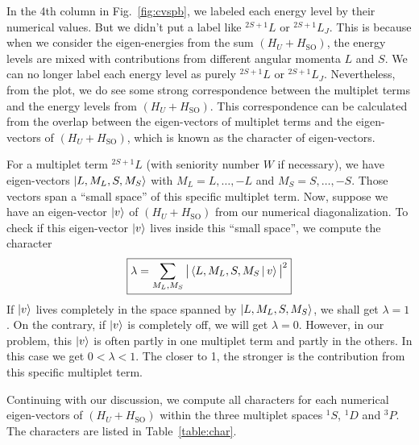 In the 4th column in Fig.~\ref{fig:cvspb}, we labeled each energy level by their numerical
values. But we didn't put a label like $^{2S+1}L$ or $^{2S+1}L_J$. This is because
when we consider the eigen-energies from the sum $(H_U+H_\text{SO})$, the energy levels are mixed
with contributions from different angular momenta $L$ and $S$. We can no longer
label each energy level as purely $^{2S+1}L$ or $^{2S+1}L_J$. Nevertheless, from the plot,
we do see some strong correspondence between the multiplet terms and the energy levels
from $(H_U+H_\text{SO})$. This correspondence can be calculated from the overlap between
the eigen-vectors of multiplet terms and the eigen-vectors of $(H_U+H_\text{SO})$, which
is known as the character of eigen-vectors.

For a multiplet term $^{2S+1}L$ (with seniority number $W$ if necessary), we have eigen-vectors
$\Ket{L,M_L,S,M_S}$ with $M_L=L,\ldots,-L$ and $M_S=S,\ldots,-S$. Those vectors span
a ``small space'' of this specific multiplet term. Now, suppose we have an
eigen-vector $\Ket{v}$ of $(H_U+H_\text{SO})$ from our numerical diagonalization.
To check if this eigen-vector $\Ket{v}$ lives inside this ``small space'',
we compute the character
\begin{equation} \label{eq:char}
\boxed{
\lambda = \sum_{M_L,M_S} \big|\Braket{L,M_L,S,M_S|v}\big|^2
}
\end{equation}
%
If $\Ket{v}$ lives completely in the space spanned by $\Ket{L,M_L,S,M_S}$,
we shall get $\lambda=1$. On the contrary, if $\Ket{v}$ is completely off,
we will get $\lambda=0$. However, in our problem, this $\Ket{v}$ is often
partly in one multiplet term and partly in the others. In this case we get
$0<\lambda<1$. The closer to 1, the stronger is the contribution from
this specific multiplet term.

Continuing with our discussion, we compute all characters for each numerical
eigen-vectors of $(H_U+H_\text{SO})$ within the three multiplet spaces $^1S$, $^1D$
and $^3P$. The characters are listed in Table~\ref{table:char}.

